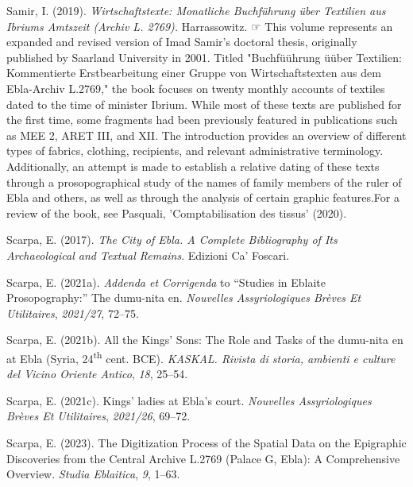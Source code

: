 \documentclass[
]{book}
\newlength{\cslhangindent}
\newlength{\cslentryspacingunit} %
\newenvironment{CSLReferences}[2] %
 {%
  \setlength{\parindent}{0pt}
  \ifodd #1
  \let\oldpar\par
  \def\par{\hangindent=\cslhangindent\oldpar}
  \fi
  \setlength{\parskip}{#2\cslentryspacingunit}
 }%
 {}
\newcommand{\CSLBlock}[1]{#1\hfill\break}
\begin{document}
\begin{CSLReferences}{1}{0}
\leavevmode{}%
Samir, I. (2019). \emph{{Wirtschaftstexte: Monatliche Buchf{ü}hrung {ü}ber Textilien aus Ibriums Amtszeit (Archiv L. 2769).}} Harrassowitz.
\CSLBlock{\newline☞ This volume represents an expanded and revised version of Imad Samir's doctoral thesis, originally published by Saarland University in 2001. Titled "Buchf{ü}ührung {ü}über Textilien: Kommentierte Erstbearbeitung einer Gruppe von Wirtschaftstexten aus dem Ebla-Archiv L.2769," the book focuses on twenty monthly accounts of textiles dated to the time of minister Ibrium. While most of these texts are published for the first time, some fragments had been previously featured in publications such as MEE 2, ARET III, and XII. The introduction provides an overview of different types of fabrics, clothing, recipients, and relevant administrative terminology. Additionally, an attempt is made to establish a relative dating of these texts through a prosopographical study of the names of family members of the ruler of Ebla and others, as well as through the analysis of certain graphic features.For a review of the book, see Pasquali, 'Comptabilisation des tissus' (2020).}

\leavevmode{}%
Scarpa, E. (2017). \emph{The {City} of {Ebla}. {A Complete Bibliography} of {Its Archaeological} and {Textual Remains}}. Edizioni Ca' Foscari.

\leavevmode{}%
Scarpa, E. (2021a). {\emph{Addenda et Corrigenda}} to {``{Studies} in {Eblaite Prosopography}:''} The dumu-nita en. \emph{Nouvelles Assyriologiques Br{è}ves Et Utilitaires}, \emph{2021/27}, 72--75.

\leavevmode{}%
Scarpa, E. (2021b). {All the Kings' Sons: The Role and Tasks of the dumu-nita en at Ebla (Syria, 24\textsuperscript{th} cent. BCE)}. \emph{KASKAL. Rivista di storia, ambienti e culture del Vicino Oriente Antico}, \emph{18}, 25--54.

\leavevmode{}%
Scarpa, E. (2021c). Kings' ladies at {Ebla}'s court. \emph{Nouvelles Assyriologiques Br{è}ves Et Utilitaires}, \emph{2021/26}, 69--72.

\leavevmode{}%
Scarpa, E. (2023). The {Digitization Process} of the {Spatial Data} on the {Epigraphic Discoveries} from the {Central Archive L}.2769 ({Palace G}, {Ebla}): {A Comprehensive Overview}. \emph{Studia Eblaitica}, \emph{9}, 1--63.


\end{CSLReferences}
\end{document}
